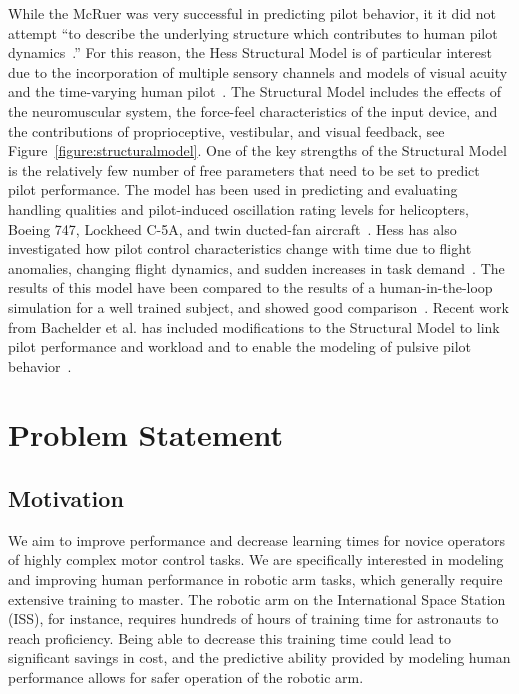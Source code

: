 While the McRuer was very successful in predicting pilot behavior, it it did not attempt ``to describe the underlying structure which contributes to human pilot dynamics~\citep{hess_structural_1980}.''
For this reason, the Hess Structural Model is of particular interest due to the incorporation of multiple sensory channels and models of visual acuity and the time-varying human pilot~\citep{hess_modeling_2009}.
The Structural Model includes the effects of the neuromuscular system, the force-feel characteristics of the input device, and the contributions of proprioceptive, vestibular, and visual feedback, see Figure~\ref{figure:structuralmodel}.
One of the key strengths of the Structural Model is the relatively few number of free parameters that need to be set to predict pilot performance.
The model has been used in predicting and evaluating handling qualities and pilot-induced oscillation rating levels for helicopters, Boeing 747, Lockheed C-5A, and twin ducted-fan aircraft~\citep{hess_analytical_2013, andreea-irina_prediction_2014, grant_handling_2015}.
Hess has also investigated how pilot control characteristics change with time due to flight anomalies, changing flight dynamics, and sudden increases in task demand~\citep{hess_modeling_2009, hess_modeling_2016}.
The results of this model have been compared to the results of a human-in-the-loop simulation for a well trained subject, and showed good comparison~\citep{hess_modeling_2016}.
Recent work from Bachelder et al. has included modifications to the Structural Model to link pilot performance and workload and to enable the modeling of pulsive pilot behavior~\citep{bachelder_modeling_2017, bachelder_linking_2018}.



% 
\section{Problem Statement}
\subsection{Motivation}
We aim to improve performance and decrease learning times for novice operators of highly complex motor control tasks.
We are specifically interested in modeling and improving human performance in robotic arm tasks, which generally require extensive training to master.
The robotic arm on the International Space Station (ISS), for instance, requires hundreds of hours of training time for astronauts to reach proficiency.
Being able to decrease this training time could lead to significant savings in cost, and the predictive ability provided by modeling human performance allows for safer operation of the robotic arm.

